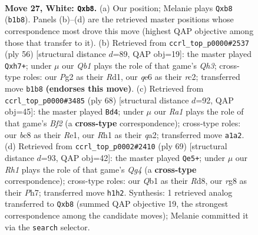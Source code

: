 \documentclass[11pt]{article}
\begin{document}
\clearpage

\begin{figure}[p]\centering
\begin{subfigure}{0.46\textwidth}\centering
\resizebox{\linewidth}{!}{%
\newchessgame
\chessboard[
  setfen={1nb2kr1/4n3/4q3/4Pp2/p7/P4K2/2P3Pp/RQ5R w - - 0 27},
  showmover=false,
  pgfstyle=straightmove, color=movearrow, markmove={b1-b8}
]}
\caption{}
\end{subfigure}\hfill
\begin{subfigure}{0.46\textwidth}\centering
\resizebox{\linewidth}{!}{%
\newchessgame
\chessboard[
  setfen={8/p4k1p/2n2qp1/8/4p3/1P2P2Q/P1r1B2P/3RK3 w - - 2 29},
  showmover=false,
  pgfstyle=straightmove, color=movearrow, markmove={h3-h7}
]}
\caption{}
\end{subfigure}
\\[4pt]
\begin{subfigure}{0.46\textwidth}\centering
\resizebox{\linewidth}{!}{%
\newchessgame
\chessboard[
  setfen={6k1/5pp1/5n1p/3r1P2/8/2Q5/qP3BPP/4R2K w - - 0 35},
  showmover=false,
  pgfstyle=straightmove, color=movearrow, markmove={f2-d4}
]}
\caption{}
\end{subfigure}\hfill
\begin{subfigure}{0.46\textwidth}\centering
\resizebox{\linewidth}{!}{%
\newchessgame
\chessboard[
  setfen={1r1r3k/7p/p5p1/1bN3q1/4P3/P4p1B/1P3Q1K/R2R4 b - - 3 35},
  showmover=false,
  pgfstyle=straightmove, color=movearrow, markmove={g5-e5}
]}
\caption{}
\end{subfigure}
\caption{\textbf{Move 27, White: \texttt{Qxb8}.} (a) Our position; Melanie plays \texttt{Qxb8} (\texttt{b1b8}). Panels (b)--(d) are the retrieved master positions whose correspondence most drove this move (highest QAP objective among those that transfer to it). (b) Retrieved from \texttt{ccrl\_top\_p0000\#2537} (ply 56) [structural distance $d$=89, QAP obj=19]: the master played \texttt{Qxh7+}; under $\mu$ our \emph{Qb1} plays the role of that game's \emph{Qh3}; cross-type roles: our \emph{P}g2 as their \emph{R}d1, our \emph{q}e6 as their \emph{r}c2; transferred move \texttt{b1b8} \textbf{(endorses this move)}. (c) Retrieved from \texttt{ccrl\_top\_p0000\#3485} (ply 68) [structural distance $d$=92, QAP obj=45]: the master played \texttt{Bd4}; under $\mu$ our \emph{Ra1} plays the role of that game's \emph{Bf2} (a \textbf{cross-type} correspondence); cross-type roles: our \emph{b}c8 as their \emph{R}e1, our \emph{R}h1 as their \emph{q}a2; transferred move \texttt{a1a2}. (d) Retrieved from \texttt{ccrl\_top\_p0002\#2410} (ply 69) [structural distance $d$=93, QAP obj=42]: the master played \texttt{Qe5+}; under $\mu$ our \emph{Rh1} plays the role of that game's \emph{Qg4} (a \textbf{cross-type} correspondence); cross-type roles: our \emph{Q}b1 as their \emph{R}d8, our \emph{r}g8 as their \emph{P}h7; transferred move \texttt{h1h2}. Synthesis: 1 retrieved analog transferred to \texttt{Qxb8} (summed QAP objective 19, the strongest correspondence among the candidate moves); Melanie committed it via the \texttt{search} selector.}
\label{fig:thought-m52}
\end{figure}
\end{document}
